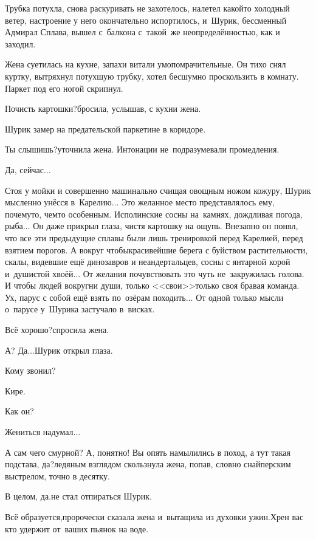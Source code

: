 {	Трубка потухла, снова раскуривать не захотелось, налетел какой\sdash то холодный ветер, настроение у него окончательно испортилось, и~Шурик, бессменный Адмирал Сплава, вышел с~балкона с~такой~же неопределённостью, как и заходил.
	
	Жена суетилась на кухне, запахи витали умопомрачительные. Он тихо снял куртку, вытряхнул потухшую трубку, хотел бесшумно проскользить в комнату. Паркет под его ногой скрипнул. 
	
	\diagdash Почисть картошки?\mdash бросила, услышав, с кухни жена.
	
	Шурик замер на предательской паркетине в коридоре.
	
	\diagdash Ты слышишь?\mdash уточнила жена. Интонации не~подразумевали промедления.
	
	\diagdash Да, сейчас$\ldots$
	
	Стоя у мойки и совершенно машинально счищая овощным ножом кожуру, Шурик мысленно унёсся в~Карелию$\ldots$ Это желанное место представлялось ему, почему\sdash то, чем\sdash то особенным. Исполинские сосны на~камнях, дождливая погода, рыба$\ldots$ Он даже прикрыл глаза, чистя картошку на ощупь. Внезапно он понял, что все эти предыдущие сплавы были лишь тренировкой перед Карелией, перед взятием порогов. А вокруг чтобы\mdash красивейшие берега с буйством растительности, скалы, видевшие ещё динозавров и неандертальцев, сосны с янтарной корой и~душистой хвоёй$\ldots$ От желания почувствовать это чуть не~закружилась голова. И чтобы людей вокруг\mdash ни души, только <<свои>>\mdash только своя бравая команда. Ух, парус с собой ещё взять по~озёрам походить$\ldots$ От одной только мысли о~парусе у~Шурика застучало в~висках.
	
	\diagdash Всё хорошо?\mdash спросила жена.
	
	\diagdash А? Да$\ldots$\mdash Шурик открыл глаза.
	
	\diagdash Кому звонил?
	
	\diagdash Кире.
	
	\diagdash Как он? 
	
	\diagdash Жениться надумал$\ldots$ 
	
	\diagdash А сам чего смурной? А, понятно! Вы опять намылились в поход, а тут такая подстава, да?\mdash ледяным взглядом скользнула жена, попав, словно снайперским выстрелом, точно в десятку.%
	
	\diagdash В целом, да.\mdash не стал отпираться Шурик.
	
	\diagdash Всё образуется,\mdash пророчески сказала жена и~вытащила из духовки ужин.\mdash Хрен вас кто удержит от~ваших пьянок на воде.
	
}
